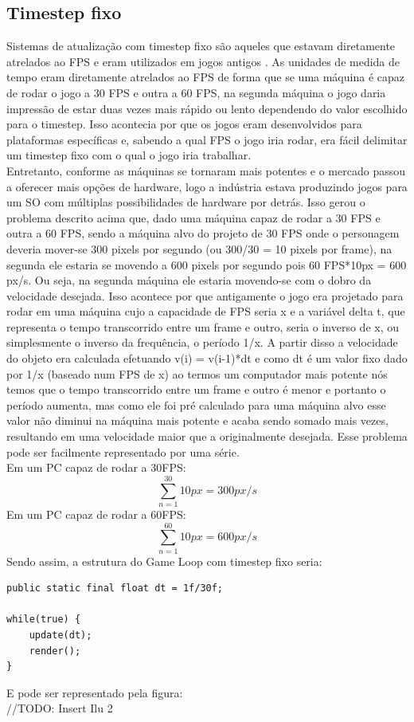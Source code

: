 \documentclass[12pt, 
openright, 
oneside, 
a4paper,    
brazil]{facom-ufu-abntex2}
\begin{document}
\subsection{Timestep fixo}
Sistemas de atualização com timestep fixo são aqueles que estavam diretamente atrelados ao FPS e eram utilizados em jogos antigos \cite{GameEngineArchitecture}. As unidades de medida de tempo eram diretamente atrelados ao FPS de forma que se uma máquina é capaz de rodar o jogo a 30 FPS e outra a 60 FPS, na segunda máquina o jogo daria impressão de estar duas vezes mais rápido ou lento dependendo do valor escolhido para o timestep. Isso acontecia por que os jogos eram desenvolvidos para plataformas específicas e, sabendo a qual FPS o jogo iria rodar, era fácil delimitar um timestep fixo com o qual o jogo iria trabalhar.\\ Entretanto, conforme as máquinas se tornaram mais potentes e o mercado passou a oferecer mais opções de hardware, logo a indústria estava produzindo jogos para um SO com múltiplas possibilidades de hardware por detrás. Isso gerou o problema descrito acima que, dado uma máquina capaz de rodar a 30 FPS e outra a 60 FPS, sendo a máquina alvo do projeto de 30 FPS onde o personagem deveria mover-se 300 pixels por segundo (ou 300/30 = 10 pixels por frame), na segunda ele estaria se movendo a 600 pixels por segundo pois 
60 FPS*10px = 600 px/s. Ou seja, na segunda máquina ele estaria movendo-se com o dobro da velocidade desejada. Isso acontece por que antigamente o jogo era projetado para rodar em uma máquina cujo a capacidade de FPS seria x e a variável delta t, que representa o tempo transcorrido entre um frame e outro, seria o inverso de x, ou simplesmente o inverso da frequência, o período 1/x. A partir disso a velocidade do objeto era calculada efetuando v(i) = v(i-1)*dt e como dt é um valor fixo dado por 1/x (baseado num FPS de x) ao termos um computador mais potente nós temos que o tempo transcorrido entre um frame e outro é menor e portanto o período aumenta, mas como ele foi pré calculado para uma máquina alvo esse valor não diminui na máquina mais potente e acaba sendo somado mais vezes, resultando em uma velocidade maior que a originalmente desejada. Esse problema pode ser facilmente representado por uma série.\\
 	Em um PC capaz de rodar a 30FPS: $$\sum_{n=1}^{30} 10px = 300 px/s$$
 	Em um PC capaz de rodar a 60FPS:$$\sum_{n=1}^{60} 10px = 600 px/s$$
Sendo assim, a estrutura do Game Loop com timestep fixo seria:
\begin{lstlisting}[caption=Game Loop com timestep fixo]
public static final float dt = 1f/30f;

while(true) {
	update(dt);
	render();
}
\end{lstlisting}
E pode ser representado pela figura:\\
//TODO: Insert Ilu 2
\end{document}

